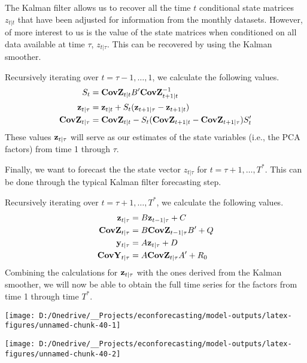 \documentclass[11pt, letterpaper]{article}\usepackage[]{graphicx}\usepackage[]{color}
\newcommand{\vv}[1]{\textcolor{black}{\mathbf{#1}}}
\begin{document}
The Kalman filter allows us to recover all the time $t$ conditional state matrices $z_{t|t}$ that have been adjusted for information from the monthly datasets. However, of more interest to us is the value of the state matrices when conditioned on all data available at time $\tau$, $z_{t|\tau}$. This can be recovered by using the Kalman smoother.

Recursively iterating over $t = \tau - 1, \dots, 1$, we calculate the following values. 
\begin{align*}
	S_{t} &= \vv{CovZ}_{t|t} B' \vv{CovZ}^{-1}_{t + 1|t}\\
	\vv{z}_{t|\tau} &= \vv{z}_{t|t} + S_t (\vv{z}_{t+1|\tau} - \vv{z}_{t + 1|t})\\
	\vv{CovZ}_{t|\tau} &= \vv{CovZ}_{t|t} - S_t(\vv{CovZ}_{t + 1|t} - \vv{CovZ}_{t + 1|\tau})S'_t
\end{align*}
These values $\vv{z}_{t|\tau}$ will serve as our estimates of the state variables (i.e., the PCA factors) from time 1 through $\tau$.

Finally, we want to forecast the the state vector $z_{t|\tau}$ for $t = \tau + 1, \dots, T^*$. This can be done through the typical Kalman filter forecasting step.

Recursively iterating over $t = \tau + 1, \dots, T^*$, we calculate the following values.
\begin{align*}
	\vv{z}_{t|\tau} &= B \vv{z}_{t-1|\tau} + C\\
	\vv{CovZ}_{t|\tau} &= B \vv{CovZ}_{t-1|\tau} B'+ Q\\
	\vv{y}_{t|\tau} &= A \vv{z}_{t|\tau} + D\\
	\vv{CovY}_{t|\tau} &= A \vv{CovZ}_{t|\tau} A' + R_0
\end{align*}
Combining the calculations for $\vv{z}_{t|\tau}$ with the ones derived from the Kalman smoother, we will now be able to obtain the full time series for the factors from time 1 through time $T^*$.



{\centering \texttt{[image: D:/Onedrive/\_\_Projects/econforecasting/model-outputs/latex-figures/unnamed-chunk-40-1]} 

}




{\centering \texttt{[image: D:/Onedrive/\_\_Projects/econforecasting/model-outputs/latex-figures/unnamed-chunk-40-2]} 

}
\end{document}
